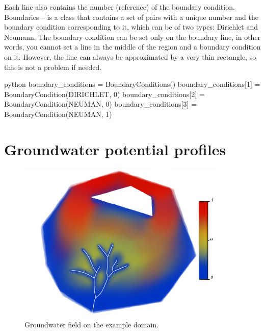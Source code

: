 \documentclass[]{pracamgr}
\begin{document}
      Each line also contains the number (reference) of the boundary condition. Boundaries -- is a class that contains a set of pairs with a unique number and the boundary condition corresponding to it, which can be of two types: Dirichlet and Neumann. The boundary condition can be set only on the boundary line, in other words, you cannot set a line in the middle of the region and a boundary condition on it. However, the line can always be approximated by a very thin rectangle, so this is not a problem if needed.

      \begin{mintedbox}{python}
        boundary_conditions = BoundaryConditions()
        boundary_conditions[1] = BoundaryCondition(DIRICHLET, 0)
        boundary_conditions[2] = BoundaryCondition(NEUMAN, 0)
        boundary_conditions[3] = BoundaryCondition(NEUMAN, 1)\end{mintedbox}

    \section{Groundwater potential profiles}

      \begin{figure}[H]
        \centering
        \includegraphics[width=0.9\textwidth]{figs/solver.png}        
        \caption {Groundwater field on the example domain.}
        \label{solver}
      \end{figure}
\end{document}

